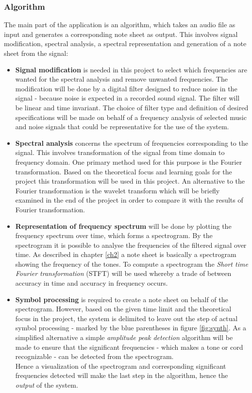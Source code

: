 \subsubsection{Algorithm}
The main part of the application is an algorithm, which takes an audio file as input and generates a corresponding note sheet as output. This involves signal modification, spectral analysis, a spectral representation and generation of a note sheet from the signal:
\begin{itemize}
\item[] \textbf{Signal modification} is needed in this project to select which frequencies are wanted for the spectral analysis and remove unwanted frequencies. The modification will be done by a digital filter designed to reduce noise in the signal - because noise is expected in a recorded sound signal. The filter will be linear and time invariant. The choice of filter type and definition of desired specifications will be made on behalf of a frequency analysis of selected music and noise signals that could be representative for the use of the system.             
\item[] \textbf{Spectral analysis} concerns the spectrum of frequencies corresponding to the signal. This involves transformation of the signal from time domain to frequency domain.     
One primary method used for this purpose is the Fourier transformation. Based on the theoretical focus and learning goals for the project this transformation will be used in this project. An alternative to the Fourier transformation is the wavelet transform which will be briefly examined in the end of the project in order to compare it with the results of Fourier transformation.  
\item[] \textbf{Representation of frequency spectrum} will be done by plotting the frequency spectrum over time, which forms a spectrogram. By the spectrogram it is possible to analyse the frequencies of the filtered signal over time. As described in chapter \ref{ch2} a note sheet is basically a spectrogram showing the frequency of the tones. To compute a spectrogram the \textit{Short time Fourier transformation} (STFT) will be used whereby a trade of between accuracy in time and accuracy in frequency occurs.  

\item[] \textbf{Symbol processing} is required to create a note sheet on behalf of the spectrogram. 
However, based on the given time limit and the theoretical focus in the project, the system is delimited to leave out the step of actual symbol processing - marked by the blue parentheses in figure \ref{fig:synth}. As a simplified alternative a simple \textit{amplitude peak detection} algorithm will be made to ensure that the significant frequencies - which makes a tone or cord recognizable - can be detected from the spectrogram. \\       
Hence a visualization of the spectrogram and corresponding significant frequencies detected will make the last step in the algorithm, hence the \textit{output} of the system.
\end{itemize}


